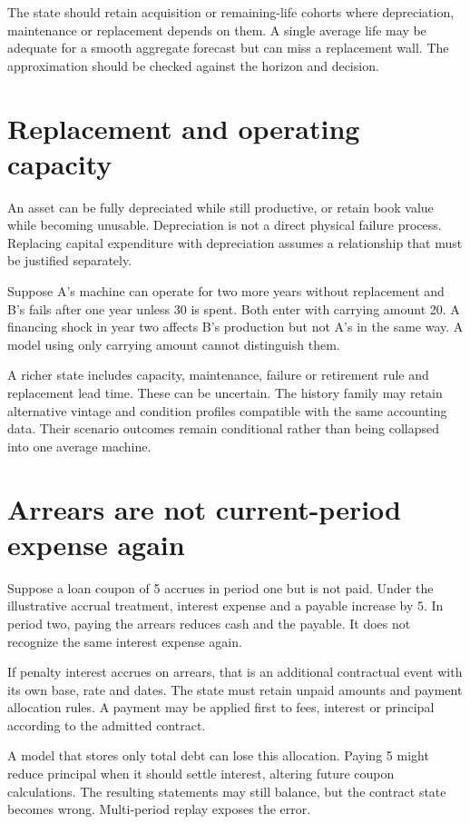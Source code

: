 The state should retain acquisition or remaining-life cohorts where depreciation, maintenance or replacement depends on them. A single average life may be adequate for a smooth aggregate forecast but can miss a replacement wall. The approximation should be checked against the horizon and decision.

\section{Replacement and operating capacity}
An asset can be fully depreciated while still productive, or retain book value while becoming unusable. Depreciation is not a direct physical failure process. Replacing capital expenditure with depreciation assumes a relationship that must be justified separately.

Suppose A's machine can operate for two more years without replacement and B's fails after one year unless 30 is spent. Both enter with carrying amount 20. A financing shock in year two affects B's production but not A's in the same way. A model using only carrying amount cannot distinguish them.

A richer state includes capacity, maintenance, failure or retirement rule and replacement lead time. These can be uncertain. The history family may retain alternative vintage and condition profiles compatible with the same accounting data. Their scenario outcomes remain conditional rather than being collapsed into one average machine.

\section{Arrears are not current-period expense again}
Suppose a loan coupon of 5 accrues in period one but is not paid. Under the illustrative accrual treatment, interest expense and a payable increase by 5. In period two, paying the arrears reduces cash and the payable. It does not recognize the same interest expense again.

If penalty interest accrues on arrears, that is an additional contractual event with its own base, rate and dates. The state must retain unpaid amounts and payment allocation rules. A payment may be applied first to fees, interest or principal according to the admitted contract.

A model that stores only total debt can lose this allocation. Paying 5 might reduce principal when it should settle interest, altering future coupon calculations. The resulting statements may still balance, but the contract state becomes wrong. Multi-period replay exposes the error.

